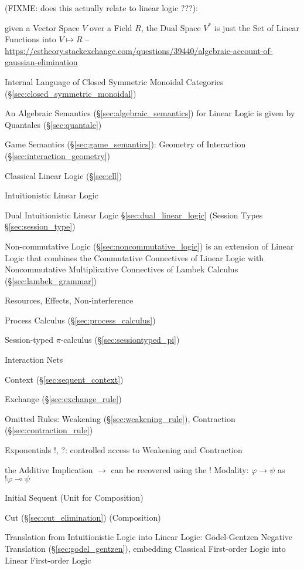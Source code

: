 (FIXME: does this actually relate to linear logic ???):

given a Vector Space $V$ over a Field $R$, the Dual Space $V^*$ is just the Set
of Linear Functions into $V \mapsto R$
--\url{https://cstheory.stackexchange.com/questions/39440/algebraic-account-of-gaussian-elimination}


\asterism


Internal Language of Closed Symmetric Monoidal Categories
(\S\ref{sec:closed_symmetric_monoidal})

An Algebraic Semantics (\S\ref{sec:algebraic_semantics}) for Linear
Logic is given by Quantales (\S\ref{sec:quantale})

Game Semantics (\S\ref{sec:game_semantics}): Geometry of Interaction
(\S\ref{sec:interaction_geometry})

Classical Linear Logic (\S\ref{sec:cll})

Intuitionistic Linear Logic

Dual Intuitionistic Linear Logic \S\ref{sec:dual_linear_logic}
(Session Types \S\ref{sec:session_type}) \cite{caires-pfenning10}

\fist Non-commutative Logic (\S\ref{sec:noncommutative_logic}) is an
extension of Linear Logic that combines the Commutative Connectives of
Linear Logic with Noncommutative Multiplicative Connectives of Lambek
Calculus (\S\ref{sec:lambek_grammar})

Resources, Effects, Non-interference \cite{caires-pfenning10}

Process Calculus (\S\ref{sec:process_calculus})

Session-typed $\pi$-calculus (\S\ref{sec:sessiontyped_pi})

Interaction Nets %

Context (\S\ref{sec:sequent_context})

Exchange (\S\ref{sec:exchange_rule})

Omitted Rules: Weakening (\S\ref{sec:weakening_rule}), Contraction
(\S\ref{sec:contraction_rule})

Exponentials $!$, $?$: controlled access to Weakening and Contraction

the Additive Implication $\rightarrow$ can be recovered using the $!$
Modality: $\varphi \rightarrow \psi$ as $!\varphi \multimap \psi$

Initial Sequent (Unit for Composition)

Cut (\S\ref{sec:cut_elimination}) (Composition)

Translation from Intuitionistic Logic into Linear Logic:
G\"odel-Gentzen Negative Translation (\S\ref{sec:godel_gentzen}),
embedding Classical First-order Logic into Linear First-order Logic

